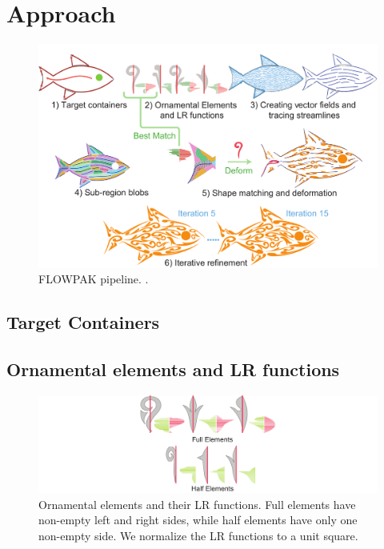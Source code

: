 \section{Approach}

\begin{figure}
\centering
\includegraphics[width=1.0\textwidth]{figures/flowpak/pipeline.pdf} 
\caption{\label{fig_flowpak_pipeline} 
FLOWPAK pipeline. .}
\end{figure}

\subsection{Target Containers}
\subsection{Ornamental elements and LR functions}

\begin{figure}
\centering
\includegraphics[width=1.0\textwidth]{figures/flowpak/ornaments.pdf}
\caption{\label{ornamental_shapes_fig}
Ornamental elements and their LR functions. Full elements have non-empty
left and right sides, while half elements have only one non-empty side. 
We normalize the LR functions to a unit square.}
\end{figure}

